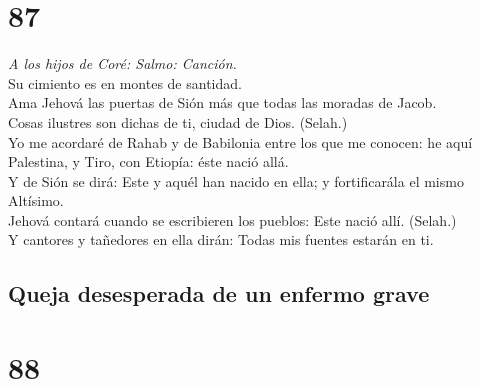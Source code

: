 \hypertarget{section-86}{%
\section{87}\label{section-86}}

 \emph{A los hijos de Coré: Salmo: Canción.}\\
Su cimiento es en montes de santidad.\\
 Ama Jehová las puertas de Sión más que todas las moradas de
Jacob.\\
 Cosas ilustres son dichas de ti, ciudad de Dios. (Selah.)\\
 Yo me acordaré de Rahab y de Babilonia entre los que me
conocen: he aquí Palestina, y Tiro, con Etiopía: éste nació allá.\\
 Y de Sión se dirá: Este y aquél han nacido en ella; y
fortificarála el mismo Altísimo.\\
 Jehová contará cuando se escribieren los pueblos: Este
nació allí. (Selah.)\\
 Y cantores y tañedores en ella dirán: Todas mis fuentes
estarán en ti.

\hypertarget{queja-desesperada-de-un-enfermo-grave}{%
\subsection{Queja desesperada de un enfermo
grave}\label{queja-desesperada-de-un-enfermo-grave}}

\hypertarget{section-87}{%
\section{88}\label{section-87}}

